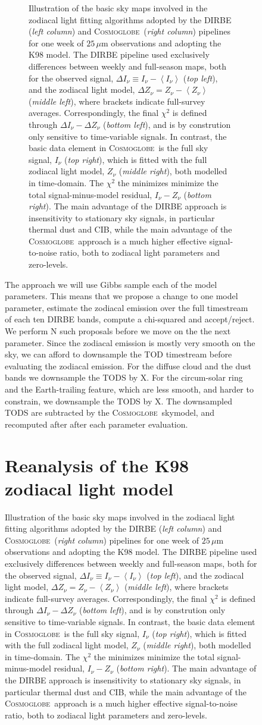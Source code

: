 \documentclass{aa}
\def\Cosmoglobe{\textsc{Cosmoglobe}}
\begin{document}
\begin{figure}
\begin{figure}
    \caption{Illustration of the basic sky maps involved in the zodiacal light fitting algorithms adopted by the DIRBE (\emph{left column}) and \Cosmoglobe\ (\emph{right column}) pipelines for one week of $25\,\mu\mathrm{m}$ observations and adopting the K98 model. The DIRBE pipeline used exclusively differences between weekly and full-season maps, both for the observed signal, $\Delta I_{\nu} \equiv I_{\nu}-\left<I_{\nu}\right>$ (\emph{top left}), and the zodiacal light model, $\Delta Z_{\nu} = Z_{\nu}-\left<Z_{\nu}\right>$ (\emph{middle left}), where brackets indicate full-survey averages. Correspondingly, the final $\chi^2$ is defined through $\Delta I_{\nu} - \Delta Z_{\nu}$ (\emph{bottom left}), and is by constrution only sensitive to time-variable signals. In contrast, the basic data element in \Cosmoglobe\ is the full sky signal, $I_{\nu}$ (\emph{top right}), which is fitted with the full zodiacal light model, $Z_{\nu}$ (\emph{middle right}), both modelled in time-domain. The $\chi^2$ the minimizes minimize the total signal-minus-model residual, $I_{\nu}-Z_{\nu}$ (\emph{bottom right}). The main advantage of the DIRBE approach is insensitivity to stationary sky signals, in particular thermal dust and CIB, while the main advantage of the \Cosmoglobe\ approach is a much higher effective signal-to-noise ratio, both to zodiacal light parameters and zero-levels.}
    \label{fig:week_vs_full}
  \end{figure}


The approach we will use Gibbs sample each of the model parameters. This means that we propose a change to one model parameter, estimate the zodiacal emission over the full timestream of each ten DIRBE bands, compute a chi-squared and accept/reject. We perform N such proposals before we move on the the next parameter. Since the zodiacal emission is mostly very smooth on the sky, we can afford to downsample the TOD timestream before evaluating the zodiacal emission. For the diffuse cloud and the dust bands we downsample the TODS by X. For the circum-solar ring and the Earth-trailing feature, which are less smooth, and harder to constrain, we downsample the TODS by X. The downsampled TODS are subtracted by the \Cosmoglobe\ skymodel, and recomputed after after each parameter evaluation. 








\clearpage
\section{Reanalysis of the K98 zodiacal light model}




\end{figure}
\end{document}
